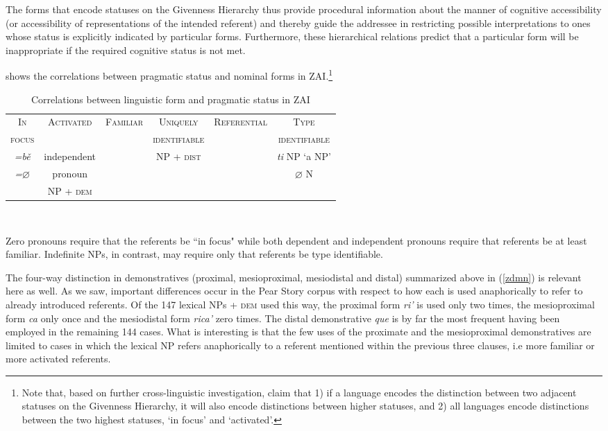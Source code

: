 The forms that encode statuses on the Givenness Hierarchy thus provide procedural information about the manner of cognitive accessibility (or accessibility of representations of the intended referent) and thereby guide the addressee in restricting possible interpretations to ones whose status is explicitly indicated by particular forms. Furthermore, these  hierarchical relations predict that a particular form will be inappropriate if the required cognitive status is not met. 


 shows the correlations between pragmatic status and nominal forms in ZAI.\footnote{Note that, based on further cross-linguistic investigation, \citet{gundel2010} claim that 1) if a language encodes the distinction between two adjacent statuses on the Givenness Hierarchy, it will also encode distinctions between higher statuses, and 2) all languages encode distinctions between the two highest statuses, `in focus' and `activated'.}


\begin{table}[H]
\begin{center}
\begin{tabular}{| c | c | c | c | c | c |}\hline
 \textsc{In} & \textsc{Activated} & \textsc{Familiar} & \textsc{Uniquely} & \textsc{Referential} & \textsc{Type} \\
  \textsc{focus} &  & & \textsc{identifiable} &  & \textsc{identifiable} \\
\hline
\hline
 \textit{=b\v{e}}  & independent &  & NP + \textsc{dist} &  & \textit{ti} NP `a NP' \\
  \textit{=$\varnothing$}  &  pronoun &  & & & {$\varnothing$ N}   \\
  & NP + \textsc{dem} & & & &  \\
\hline
\end{tabular}\\
\caption{\small{Correlations between linguistic form and pragmatic status in ZAI}}
\label{izcorrelations}
\end{center}
\end{table}


Zero pronouns require that the referents be ``in focus" while both dependent and independent pronouns require that referents be at least familiar. Indefinite NPs, in contrast, may require only that referents be type identifiable. 

The four-way distinction in demonstratives (proximal, mesioproximal, mesiodistal and distal) summarized above in (\ref{zdmn}) is relevant here as well. As we saw, important differences occur in the Pear Story corpus with respect to how each is used anaphorically to refer to already introduced referents. Of the 147 lexical NPs + \textsc{dem} used this way, the proximal form \textit{ri'} is used only two times, the mesioproximal form \textit{ca} only once and the mesiodistal form \textit{rica'} zero times. The distal demonstrative \textit{que} is by far the most frequent having been employed in the remaining 144 cases. What is interesting is that the few uses of the proximate and the mesioproximal demonstratives are limited to cases in which the lexical NP refers anaphorically to a referent mentioned within the previous three clauses, i.e more familiar or more activated referents. 


